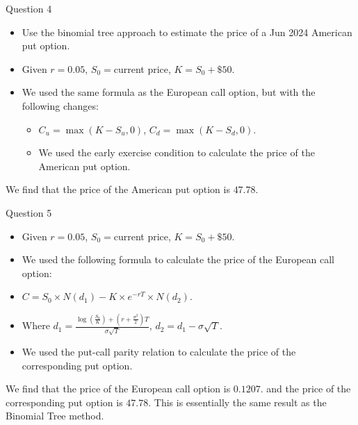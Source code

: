 \documentclass[compress,12pt]{beamer}
\begin{document}
\begin{frame}{Question 4}
      \begin{itemize}
            \item Use the binomial tree approach to estimate the price of a Jun 2024 American put option.
            \item Given $r = 0.05$, $S_0 =  $current price, $K = S_0 + \$50$.
            \item We used the same formula as the European call option, but with the following changes:
            \begin{itemize}
                  \item $C_u = \max(K - S_u, 0)$, $C_d = \max(K - S_d, 0)$.
                  \item We used the early exercise condition to calculate the price of the American put option.
            \end{itemize}
      \end{itemize}

      \begin{tcolorbox}
            We find that the price of the American put option is $\boxed{47.78}$.
      \end{tcolorbox}
\end{frame}


\begin{frame}{Question 5}

      \begin{itemize}
            \item Given $r = 0.05$, $S_0 =  $current price, $K = S_0 + \$50$.
            \item We used the following formula to calculate the price of the European call option:
            \item $C = S_0 \times N(d_1) - K \times e^{-rT} \times N(d_2)$.
            \item Where $d_1 = \frac{\log(\frac{S_0}{K}) + (r + \frac{\sigma^2}{2})T}{\sigma \sqrt{T}}$, $d_2 = d_1 - \sigma \sqrt{T}$.
            \item We used the put-call parity relation to calculate the price of the corresponding put option.
      \end{itemize}

      \begin{tcolorbox}
            We find that the price of the European call option is $\boxed{0.1207}$.
            and the price of the corresponding put option is $\boxed{47.78}$. 
            This is essentially the same result as the Binomial Tree method.
      \end{tcolorbox}

\end{frame}
\end{document}
